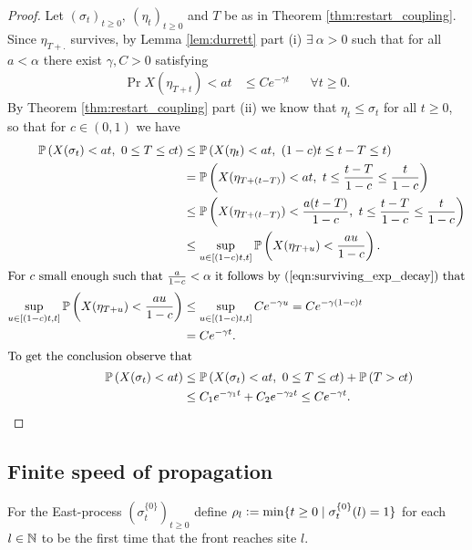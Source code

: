 \begin{proof}
Let $(\sigma_t)_{t \geq 0},\ (\eta_t)_{t \geq 0}$ and $T$ be as in Theorem \ref{thm:restart_coupling}. Since $\eta_{T + .}$ survives, by Lemma \ref{lem:durrett} part (i) $\exists\ \alpha > 0$ such that for all $a < \alpha$ there exist $\gamma, C > 0$ satisfying 
\begin{align}\label{eqn:surviving_exp_decay}
  \Pr{X(\eta_{T+t}) < at} &\leq C e^{- \gamma t}  &&\forall t \geq 0. 
\end{align}
By Theorem \ref{thm:restart_coupling} part (ii) we know that $\eta_t \leq \sigma_t$ for all $t \geq 0$, so that for $c \in (0,1)$ we have
\begin{align*}
  \Pr{X(\sigma_t) < at,\ 0 \leq T \leq ct} &\leq \Pr{X(\eta_t) < at,\ (1-c)t \leq t-T \leq t} \\
                                           &=    \Pr{X(\eta_{T + (t - T)}) < at,\ t \leq \frac{t-T}{1-c} \leq \frac{t}{1-c}} \\
                                           &\leq \Pr{X(\eta_{T + (t - T)}) < \frac{a(t - T)}{1-c},\ t \leq \frac{t-T}{1-c} \leq \frac{t}{1-c}} \\
                                           &\leq \sup\limits_{u \in [(1-c)t,t]} \Pr{X(\eta_{T + u}) < \frac{au}{1-c}}. \\
  \intertext{For $c$ small enough such that $\frac{a}{1-c} < \alpha$ it follows by (\ref{eqn:surviving_exp_decay}) that}
  \sup\limits_{u \in [(1-c)t,t]} \Pr{X(\eta_{T + u}) < \frac{au}{1-c}} &\leq \sup\limits_{u \in [(1-c)t,t]} C e^{-\gamma u}  = C e^{-\gamma (1-c) t} \\
                                                                       &= C e^{-\gamma t}. \\ 
  \intertext{To get the conclusion observe that}
    \Pr{X(\sigma_t) < at}  &\leq \Pr{X(\sigma_t) < at,\ 0 \leq T \leq ct} + \Pr{T > ct} \\
                           &\leq C_1 e^{-\gamma_1 t} + C_2 e^{-\gamma_2 t} \leq C e^{-\gamma t}. 
\end{align*}
\end{proof}

\subsection{Finite speed of propagation}

\begin{definition}\label{def:hitting_times}
For the East-process $(\sigma^{\{0\}}_t)_{t \geq 0}$ define $\rho_l \defeq \min\{ t \geq 0 \mid \sigma^{\{0\}}_t(l) = 1\}$ for each $l \in \N$ to be the first time that the front reaches site $l$. 
\end{definition}

